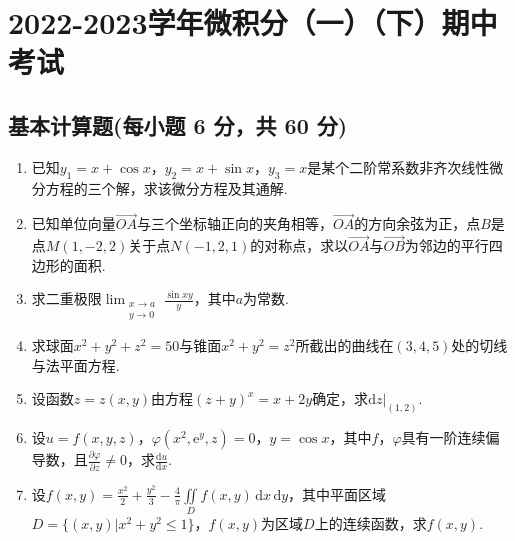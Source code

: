 \documentclass[../main.tex]{subfiles}
\begin{document}
\chapter{2022-2023学年微积分（一）（下）期中考试}

\section{基本计算题(每小题 6 分，共 60 分)}
\begin{enumerate}
    \item 已知$y_{1}=x+\cos x$，$y_{2}=x+\sin x$，$y_{3}=x$是某个二阶常系数非齐次线性微分方程的三个解，求该微分方程及其通解.
          \vspace{10em}

    \item 已知单位向量$\overrightarrow{OA}$与三个坐标轴正向的夹角相等，$\overrightarrow
              {OA}$的方向余弦为正，点$B$是点$M(1,-2,2)$关于点$N(-1,2,1)$的对称点，求以$\overrightarrow
              {OA}$与$\overrightarrow{OB}$为邻边的平行四边形的面积.
          \vspace{11em}

    \item 求二重极限$\lim_{\substack{x\to a \\ y\to 0}}\frac{\sin xy}{y}$，其中$a$为常数.
          \vspace{11em}

    \item 求球面$x^{2}+y^{2}+z^{2}=50$与锥面$x^{2}+y^{2}=z^{2}$所截出的曲线在$(3,
              4,5)$处的切线与法平面方程.
          \vspace{13em}

    \item 设函数$z=z(x,y)$由方程$(z+y)^{x}=x+2y$确定，求$\left.\mathrm{d}z\right|
              _{(1,2)}$.
          \vspace{13em}

    \item 设$u=f(x,y,z)$，$\varphi\left(x^{2},\mathrm{e}^{y},z\right)=0$，$y=\cos
              x$，其中$f$，$\varphi$具有一阶连续偏导数，且$\frac{\partial \varphi}{\partial
                  z}\neq 0$，求$\frac{\mathrm{d}u}{\mathrm{d}x}$.
          \vspace{13em}

    \item 设$f(x,y)=\frac{x^{2}}{2}+\frac{y^{2}}{3}-\frac{4}{\pi}\iint\limits_{D}
              f(x,y)\,\mathrm{d}x\,\mathrm{d}y$，其中平面区域$D=\{(x,y)|x^{2}+y^{2}\leq 1\}$，$f
              (x,y)$为区域$D$上的连续函数，求$f(x,y)$.
          \vspace{12em}


\end{enumerate}
\end{document}
